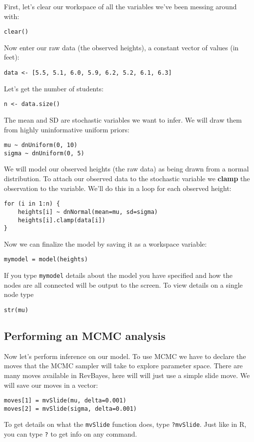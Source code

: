 \documentclass[11pt]{article}
\begin{document}
First, let's clear our workspace of all the variables we've been messing around with:
\begin{verbatim}
clear()
\end{verbatim}
Now enter our raw data (the observed heights), a constant vector of values (in feet):
\begin{verbatim}
data <- [5.5, 5.1, 6.0, 5.9, 6.2, 5.2, 6.1, 6.3]
\end{verbatim}
Let's get the number of students:
\begin{verbatim}
n <- data.size()
\end{verbatim}
The mean and SD are stochastic variables we want to infer.
We will draw them from highly uninformative
uniform priors:
\begin{verbatim}
mu ~ dnUniform(0, 10)
sigma ~ dnUniform(0, 5)
\end{verbatim}
We will model our observed heights (the raw data)
as being drawn from a normal distribution.
To attach our observed data to the stochastic variable
we \textbf{clamp} the observation to the variable.
We'll do this in a loop for each observed height:
\begin{verbatim}
for (i in 1:n) {
    heights[i] ~ dnNormal(mean=mu, sd=sigma)
    heights[i].clamp(data[i])
}
\end{verbatim}
Now we can finalize the model by saving it as a workspace variable:
\begin{verbatim}
mymodel = model(heights)
\end{verbatim}
If you type \texttt{mymodel} 
details about the model you have specified
and how the nodes are all connected will be output to the screen.
To view details on a single node type
\begin{verbatim}
str(mu)
\end{verbatim}

\subsection{Performing an MCMC analysis}

Now let's perform inference on our model.
To use MCMC we have to declare the moves that the MCMC
sampler will take to explore parameter space.
There are many moves available in RevBayes,
here will will just use a simple slide move.
We will save our moves in a vector:
\begin{verbatim}
moves[1] = mvSlide(mu, delta=0.001)
moves[2] = mvSlide(sigma, delta=0.001)
\end{verbatim}
To get details on what the \texttt{mvSlide}
function does, type \texttt{?mvSlide}.
Just like in R, you can type \texttt{?} to get info on any command.
\end{document}
